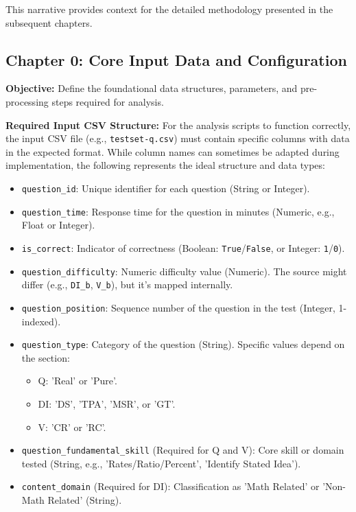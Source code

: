 \documentclass{article}
\begin{document}
This narrative provides context for the detailed methodology presented in the subsequent chapters.


\subsection{Chapter 0: Core Input Data and Configuration}

\textbf{Objective:} Define the foundational data structures, parameters, and pre-processing steps required for analysis.

\textbf{Required Input CSV Structure:}
For the analysis scripts to function correctly, the input CSV file (e.g., \texttt{testset-q.csv}) must contain specific columns with data in the expected format. While column names can sometimes be adapted during implementation, the following represents the ideal structure and data types:

\begin{itemize}
    \item \texttt{question\_id}: Unique identifier for each question (String or Integer).
    \item \texttt{question\_time}: Response time for the question in minutes (Numeric, e.g., Float or Integer).
    \item \texttt{is\_correct}: Indicator of correctness (Boolean: \texttt{True}/\texttt{False}, or Integer: \texttt{1}/\texttt{0}).
    \item \texttt{question\_difficulty}: Numeric difficulty value (Numeric). The source might differ (e.g., \texttt{DI\_b}, \texttt{V\_b}), but it's mapped internally.
    \item \texttt{question\_position}: Sequence number of the question in the test (Integer, 1-indexed).
    \item \texttt{question\_type}: Category of the question (String). Specific values depend on the section:
        \begin{itemize}
            \item Q: 'Real' or 'Pure'.
            \item DI: 'DS', 'TPA', 'MSR', or 'GT'.
            \item V: 'CR' or 'RC'.
        \end{itemize}
    \item \texttt{question\_fundamental\_skill} (Required for Q and V): Core skill or domain tested (String, e.g., 'Rates/Ratio/Percent', 'Identify Stated Idea').
    \item \texttt{content\_domain} (Required for DI): Classification as 'Math Related' or 'Non-Math Related' (String).
\end{itemize}
\end{document}
